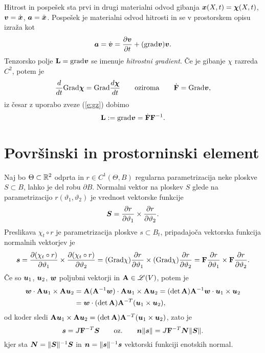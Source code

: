 \begin{primer} %
	Hitrost in pospešek sta prvi in drugi materialni odvod gibanja $\boldsymbol x(X,t)=\boldsymbol \chi(X,t)$,
	$\boldsymbol v=\dot{\boldsymbol x}$, $\boldsymbol a=\ddot{\boldsymbol x}$.
	Pospešek je materialni odvod hitrosti in se v prostorskem opisu izraža kot
	\[ \boldsymbol a=\dot{\boldsymbol v}=\frac{\partial\boldsymbol v}{\partial t}+(\mathrm{grad}\boldsymbol v)\boldsymbol v. \]
	Tenzorsko polje $\mathbf L=\mathrm{grad}\boldsymbol v$ se imenuje \emph{hitrostni gradient}.
	Če je gibanje $\chi$ razreda $C^2$, potem je
	\[
		\frac{d}{dt}\mathrm{Grad}\boldsymbol \chi=\mathrm{Grad}\frac{d\boldsymbol \chi}{dt}\qquad\textrm{oziroma}\qquad
		\dot{\mathbf F}=\mathrm{Grad}\boldsymbol v,
	\]
	iz česar z uporabo zveze (\ref{e:gz}) dobimo
	\begin{equation} \label{e:L}
		\mathbf L:=\mathrm{grad}\boldsymbol v=\dot{\mathbf F}\mathbf F^{-1}.
	\end{equation}
\end{primer}


\section{Površinski in prostorninski element}


Naj bo $\Theta\subset\mathbb R^2$ odprta in $r\in C^1(\Theta,B)$ regularna parametrizacija
neke ploskve $S\subset B$, lahko je del robu $\partial B$. Normalni vektor
na ploskev $S$ glede na parametrizacijo $r(\vartheta_1,\vartheta_2)$ je
vrednost vektorske funkcije
\[
	\boldsymbol S=\frac{\partial r}{\partial\vartheta_1}\times
	\frac{\partial r}{\partial\vartheta_2}.
\]
Preslikava $\chi_t\circ r$ je parametrizacija ploskve $s\subset B_t$, pripadajoča
vektorska funkcija normalnih vektorjev je
\[
	\boldsymbol s=\frac{\partial(\chi_t\circ r)}{\partial\vartheta_1}\times
	\frac{\partial(\chi_t\circ r)}{\partial\vartheta_2}=
	(\mathrm{Grad}\chi)\frac{\partial r}{\partial\vartheta_1}\times
	(\mathrm{Grad}\chi)\frac{\partial r}{\partial\vartheta_2}=
	\mathbf F\frac{\partial r}{\partial\vartheta_1}\times
	\mathbf F\frac{\partial r}{\partial\vartheta_2}.
\]
Če so $\boldsymbol u_1$, $\boldsymbol u_2$, $\boldsymbol w$ poljubni vektorji in $\mathbf A\in\mathscr L(V)$, potem je
\begin{align*}
	\boldsymbol w\cdot\mathbf A\boldsymbol u_1\times\mathbf A\boldsymbol u_2&=
	\mathbf A(\mathbf A^{-1}\boldsymbol w)\cdot\mathbf A\boldsymbol u_1\times\mathbf A\boldsymbol u_2=
	(\det\mathbf A)\mathbf A^{-1}\boldsymbol w\cdot\boldsymbol u_1\times\boldsymbol u_2 \\
	&=\boldsymbol w\cdot (\det\mathbf A)\mathbf A^{-T}(\boldsymbol u_1\times\boldsymbol u_2),
\end{align*}
od koder sledi $\mathbf A\boldsymbol u_1\times\mathbf A\boldsymbol u_2=
(\det\mathbf A)\mathbf A^{-T}(\boldsymbol u_1\times\boldsymbol u_2)$, zato je
\begin{equation} \label{e:nsns}
	\boldsymbol s=J\mathbf F^{-T}\boldsymbol S\qquad\textrm{oz.}\qquad
	\boldsymbol n\|\boldsymbol s\|=J\mathbf F^{-T}\boldsymbol N\|\boldsymbol S\|.
\end{equation}
kjer sta $\boldsymbol N=\|\boldsymbol S\|^{-1}\boldsymbol S$ in $\boldsymbol n=\|\boldsymbol s\|^{-1}\boldsymbol s$
vektorski funkciji enotskih normal.

